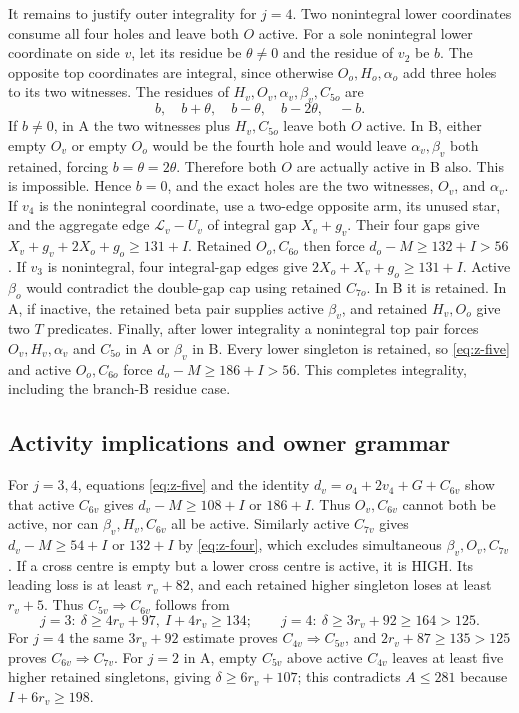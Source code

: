 \documentclass[11pt,letterpaper]{article}
\theoremstyle{definition}\newtheorem{definition}[theorem]{Definition}
\begin{document}
It remains to justify outer integrality for $j=4$. Two nonintegral lower coordinates consume all four holes and leave both $O$ active. For a sole nonintegral lower coordinate on side $v$, let its residue be $\theta\ne0$ and the residue of $v_2$ be $b$. The opposite top coordinates are integral, since otherwise $O_o,H_o,\alpha_o$ add three holes to its two witnesses. The residues of $H_v,O_v,\alpha_v,\beta_v,C_{5o}$ are
\[
 b,\quad b+\theta,\quad b-\theta,\quad b-2\theta,\quad-b.
\]
If $b\ne0$, in A the two witnesses plus $H_v,C_{5o}$ leave both $O$ active. In B, either empty $O_v$ or empty $O_o$ would be the fourth hole and would leave $\alpha_v,\beta_v$ both retained, forcing $b=\theta=2\theta$. Therefore both $O$ are actually active in B also. This is impossible. Hence $b=0$, and the exact holes are the two witnesses, $O_v$, and $\alpha_v$.
If $v_4$ is the nonintegral coordinate, use a two-edge opposite arm, its unused star, and the aggregate edge $\mathcal L_v-U_v$ of integral gap $X_v+g_v$. Their four gaps give $X_v+g_v+2X_o+g_o\ge131+I$. Retained $O_o,C_{6o}$ then force $d_o-M\ge132+I>56$.
If $v_3$ is nonintegral, four integral-gap edges give $2X_o+X_v+g_o\ge131+I$. Active $\beta_o$ would contradict the double-gap cap using retained $C_{7o}$. In B it is retained. In A, if inactive, the retained beta pair supplies active $\beta_v$, and retained $H_v,O_o$ give two $T$ predicates. Finally, after lower integrality a nonintegral top pair forces $O_v,H_v,\alpha_v$ and $C_{5o}$ in A or $\beta_v$ in B. Every lower singleton is retained, so \eqref{eq:z-five} and active $O_o,C_{6o}$ force $d_o-M\ge186+I>56$. This completes integrality, including the branch-B residue case.

\subsection{Activity implications and owner grammar}
For $j=3,4$, equations \eqref{eq:z-five} and the identity
$d_v=o_4+2v_4+G+C_{6v}$ show that active $C_{6v}$ gives
$d_v-M\ge108+I$ or $186+I$. Thus $O_v,C_{6v}$ cannot both be active, nor can $\beta_v,H_v,C_{6v}$ all be active.
Similarly active $C_{7v}$ gives $d_v-M\ge54+I$ or $132+I$ by \eqref{eq:z-four}, which excludes simultaneous $\beta_v,O_v,C_{7v}$.
If a cross centre is empty but a lower cross centre is active, it is HIGH. Its leading loss is at least $r_v+82$, and each retained higher singleton loses at least $r_v+5$. Thus $C_{5v}\Rightarrow C_{6v}$ follows from
\[
 j=3:\ \delta\ge4r_v+97,\ I+4r_v\ge134;
 \qquad j=4:\ \delta\ge3r_v+92\ge164>125.
\]
For $j=4$ the same $3r_v+92$ estimate proves $C_{4v}\Rightarrow C_{5v}$, and $2r_v+87\ge135>125$ proves $C_{6v}\Rightarrow C_{7v}$. For $j=2$ in A, empty $C_{5v}$ above active $C_{4v}$ leaves at least five higher retained singletons, giving $\delta\ge6r_v+107$; this contradicts $A\le281$ because $I+6r_v\ge198$.
\end{document}

